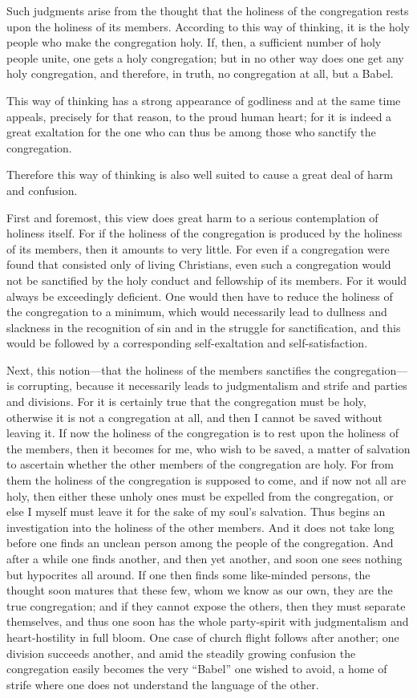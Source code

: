 Such judgments arise from the thought that the holiness of the congregation rests upon the holiness of its members. According to this way of thinking, it is the holy people who make the congregation holy. If, then, a sufficient number of holy people unite, one gets a holy congregation; but in no other way does one get any holy congregation, and therefore, in truth, no congregation at all, but a Babel.

This way of thinking has a strong appearance of godliness and at the same time appeals, precisely for that reason, to the proud human heart; for it is indeed a great exaltation for the one who can thus be among those who sanctify the congregation.

Therefore this way of thinking is also well suited to cause a great deal of harm and confusion.


First and foremost, this view does great harm to a serious contemplation of holiness itself. For if the holiness of the congregation is produced by the holiness of its members, then it amounts to very little. For even if a congregation were found that consisted only of living Christians, even such a congregation would not be sanctified by the holy conduct and fellowship of its members. For it would always be exceedingly deficient. One would then have to reduce the holiness of the congregation to a minimum, which would necessarily lead to dullness and slackness in the recognition of sin and in the struggle for sanctification, and this would be followed by a corresponding self-exaltation and self-satisfaction.

Next, this notion—that the holiness of the members sanctifies the congregation—is corrupting, because it necessarily leads to judgmentalism and strife and parties and divisions. For it is certainly true that the congregation must be holy, otherwise it is not a congregation at all, and then I cannot be saved without leaving it. If now the holiness of the congregation is to rest upon the holiness of the members, then it becomes for me, who wish to be saved, a matter of salvation to ascertain whether the other members of the congregation are holy. For from them the holiness of the congregation is supposed to come, and if now not all are holy, then either these unholy ones must be expelled from the congregation, or else I myself must leave it for the sake of my soul’s salvation. Thus begins an investigation into the holiness of the other members. And it does not take long before one finds an unclean person among the people of the congregation. And after a while one finds another, and then yet another, and soon one sees nothing but hypocrites all around. If one then finds some like-minded persons, the thought soon matures that these few, whom we know as our own, they are the true congregation; and if they cannot expose the others, then they must separate themselves, and thus one soon has the whole party-spirit with judgmentalism and heart-hostility in full bloom. One case of church flight follows after another; one division succeeds another, and amid the steadily growing confusion the congregation easily becomes the very “Babel” one wished to avoid, a home of strife where one does not understand the language of the other.

